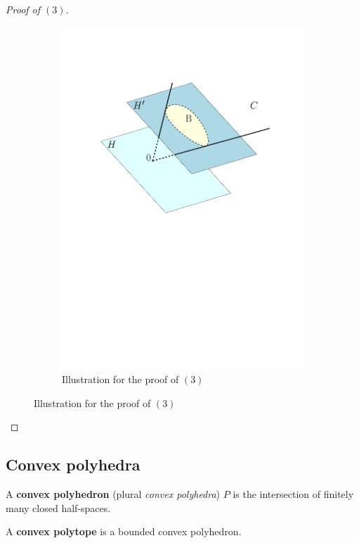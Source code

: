 \begin{proof}[Proof of \( (3) \)]
\begin{figure}
\begin{subfigure}{.5\textwidth}
     \includegraphics[scale=0.5]{figures/1697550459} 
      \caption{Illustration for the proof of \( (3) \)}
    \end{subfigure}
  \end{figure}
\end{proof}


\subsection{Convex polyhedra} %
\label{sub:Convex polyhedra}

\begin{definition}
  A \textbf{convex polyhedron} (plural \textit{convex polyhedra}) \( P \) is
  the intersection of finitely many closed half-spaces.

  A \textbf{convex polytope} is a bounded convex polyhedron.
\end{definition}

